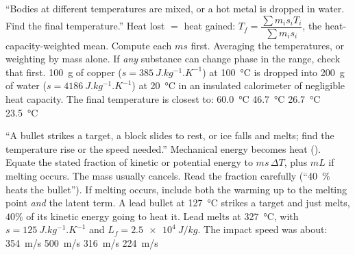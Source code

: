 {``Bodies at different temperatures are mixed, or a hot metal is dropped in water. Find the final
temperature.''}
{Heat lost $=$ heat gained: $T_f=\dfrac{\sum m_i s_i T_i}{\sum m_i s_i}$, the heat-capacity-weighted
mean. Compute each $ms$ first.}
{Averaging the temperatures, or weighting by mass alone. If \emph{any} substance can change phase in
the range, check that first.}
{\SI{100}{g} of copper ($s=\SI{385}{J.kg^{-1}.K^{-1}}$) at \SI{100}{\celsius} is dropped into
\SI{200}{g} of water ($s=\SI{4186}{J.kg^{-1}.K^{-1}}$) at \SI{20}{\celsius} in an insulated
calorimeter of negligible heat capacity. The final temperature is closest to:}
{\SI{60.0}{\celsius}}
{\SI{46.7}{\celsius}}
{\SI{26.7}{\celsius}}
{\SI{23.5}{\celsius}}

{``A bullet strikes a target, a block slides to rest, or ice falls and melts; find the temperature rise
or the speed needed.''}
{Mechanical energy becomes heat (). Equate the stated fraction of kinetic or potential
energy to $ms\,\Delta T$, plus $mL$ if melting occurs. The mass usually cancels.}
{Read the fraction carefully (``\SI{40}{\percent} heats the bullet''). If melting occurs, include both
the warming up to the melting point \emph{and} the latent term.}
{A lead bullet at \SI{127}{\celsius} strikes a target and just melts, $40\%$ of its kinetic energy
going to heat it. Lead melts at \SI{327}{\celsius}, with $s=\SI{125}{J.kg^{-1}.K^{-1}}$ and
$L_f=\SI{2.5e4}{J/kg}$. The impact speed was about:}
{\SI{354}{m/s}}
{\SI{500}{m/s}}
{\SI{316}{m/s}}
{\SI{224}{m/s}}


